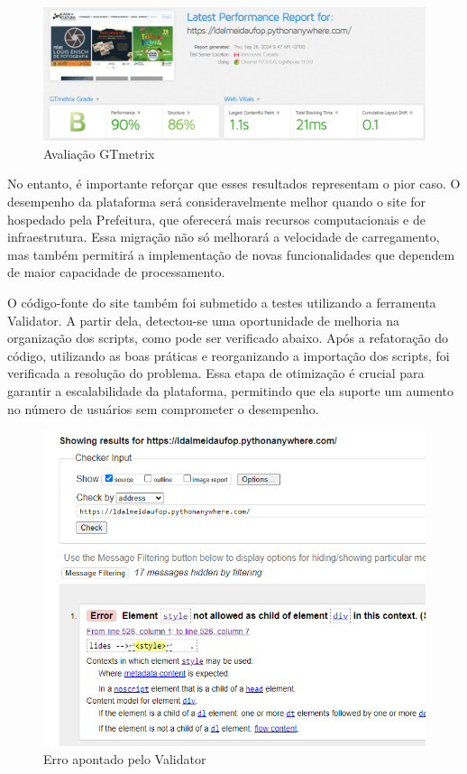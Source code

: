 \begin{figure}[htb] \caption{\label{fig_grafico}Avaliação GTmetrix} \begin{center} \includegraphics[scale=0.3]{./img/gtmetrix.png} \end{center}  \end{figure}

No entanto, é importante reforçar que esses resultados representam o pior caso. O desempenho da plataforma será consideravelmente melhor quando o site for hospedado pela Prefeitura, que oferecerá mais recursos computacionais e de infraestrutura. Essa migração não só melhorará a velocidade de carregamento, mas também permitirá a implementação de novas funcionalidades que dependem de maior capacidade de processamento.

O código-fonte do site também foi submetido a testes utilizando a ferramenta Validator. A partir dela, detectou-se uma oportunidade de melhoria na organização dos scripts, como pode ser verificado abaixo. Após a refatoração do código, utilizando as boas práticas e reorganizando a importação dos scripts, foi verificada a resolução do problema. Essa etapa de otimização é crucial para garantir a escalabilidade da plataforma, permitindo que ela suporte um aumento no número de usuários sem comprometer o desempenho.

\begin{figure}[htb] \caption{\label{fig_grafico}Erro apontado pelo Validator} \begin{center} \includegraphics[scale=0.3]{./img/validator_error.png} \end{center}  \end{figure}

